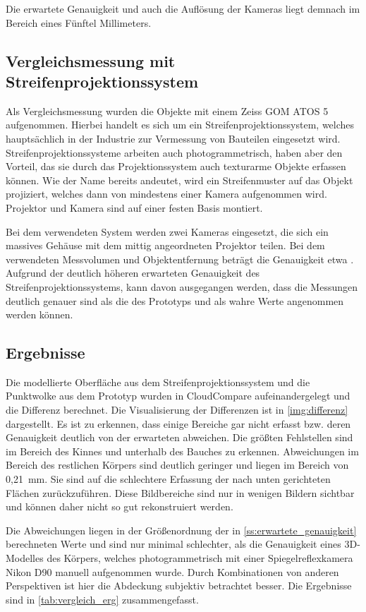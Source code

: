 \documentclass[./00PhotoBox.tex]{subfiles}
\begin{document}
Die erwartete Genauigkeit und auch die Auflösung der Kameras liegt demnach im Bereich eines Fünftel Millimeters.


\subsection{Vergleichsmessung mit Streifenprojektionssystem}
Als Vergleichsmessung wurden die Objekte mit einem Zeiss GOM ATOS 5 aufgenommen. Hierbei handelt es sich um ein Streifenprojektionssystem, welches hauptsächlich in der Industrie zur Vermessung von Bauteilen eingesetzt wird. Streifenprojektionssysteme arbeiten auch photogrammetrisch, haben aber den Vorteil, das sie durch das Projektionssystem auch texturarme Objekte erfassen können. Wie der Name bereits andeutet, wird ein Streifenmuster auf das Objekt projiziert, welches dann von mindestens einer Kamera aufgenommen wird. Projektor und Kamera sind auf einer festen Basis montiert. \citep[S. 581f]{luhmann}

Bei dem verwendeten System werden zwei Kameras eingesetzt, die sich ein massives Gehäuse mit dem mittig angeordneten Projektor teilen. Bei dem verwendeten Messvolumen und Objektentfernung beträgt die Genauigkeit etwa . Aufgrund der deutlich höheren erwarteten Genauigkeit des Streifenprojektionssystems, kann davon ausgegangen werden, dass die Messungen deutlich genauer sind als die des Prototyps und als wahre Werte angenommen werden können.

\subsection{Ergebnisse}
Die modellierte Oberfläche aus dem Streifenprojektionssystem und die Punktwolke aus dem Prototyp wurden in CloudCompare aufeinandergelegt und die Differenz berechnet. Die Visualisierung der Differenzen ist in \autoref{img:differenz} dargestellt. Es ist zu erkennen, dass einige Bereiche gar nicht erfasst bzw. deren Genauigkeit deutlich von der erwarteten abweichen. Die größten Fehlstellen sind im Bereich des Kinnes und unterhalb des Bauches zu erkennen. Abweichungen im Bereich des restlichen Körpers sind deutlich geringer und liegen im Bereich von 0,21~mm. Sie sind auf die schlechtere Erfassung der nach unten gerichteten Flächen zurückzuführen. Diese Bildbereiche sind nur in wenigen Bildern sichtbar und können daher nicht so gut rekonstruiert werden.

Die Abweichungen liegen in der Größenordnung der in \autoref{ss:erwartete_genauigkeit} berechneten Werte und sind nur minimal schlechter, als die Genauigkeit eines 3D-Modelles des Körpers, welches photogrammetrisch mit einer Spiegelreflexkamera Nikon D90 manuell aufgenommen wurde. Durch Kombinationen von anderen Perspektiven ist hier die Abdeckung subjektiv betrachtet besser. Die Ergebnisse sind in \autoref{tab:vergleich_erg} zusammengefasst.
\end{document}
